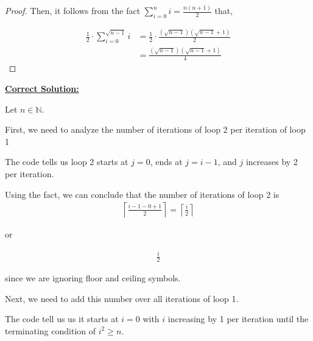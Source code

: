 \documentclass[12pt]{article}
\begin{document}
\begin{enumerate}[a.]
\begin{proof}
        \bigskip

        Then, it follows from the fact $\sum\limits_{i=0}^n i = \frac{n(n+1)}{2}$ that,

        \begin{align}
            \frac{1}{2} \cdot \sum\limits_{i=0}^{\sqrt{n-1}} i &= \frac{1}{2} \cdot \frac{(\sqrt{n-1})(\sqrt{n-1} + 1)}{2}\\
            &= \frac{(\sqrt{n-1})(\sqrt{n-1} + 1)}{4}
        \end{align}

    \end{proof}

    \bigskip

    \begin{mdframed}
        \underline{\textbf{Correct Solution:}}

        \bigskip

        Let $n \in \mathbb{N}$.

        \bigskip

        First, we need to analyze the number of iterations of loop 2 per iteration of
        loop 1

        \bigskip

        The code tells us loop 2 starts at $j = 0$, ends at $j = i-1$, and $j$ increases
        by 2 per iteration.

        \bigskip

        Using the fact, we can conclude that the number of iterations of loop 2 is
        \setcounter{equation}{0}
        \begin{align}
            \left\lceil \frac{i-1-0+1}{2} \right\rceil = \left\lceil \frac{i}{2} \right\rceil
        \end{align}

        or

        \begin{align}
            \frac{i}{2}
        \end{align}

        since we are ignoring floor and ceiling symbols.

        \bigskip

        Next, we need to add this number over all iterations of loop 1.

        \bigskip

        The code tell us us it starts at $i = 0$ with \color{red}$i$ increasing by 1 per iteration
        until the terminating condition of $i^2 \geq n$.


\end{mdframed}
\end{enumerate}
\end{document}

